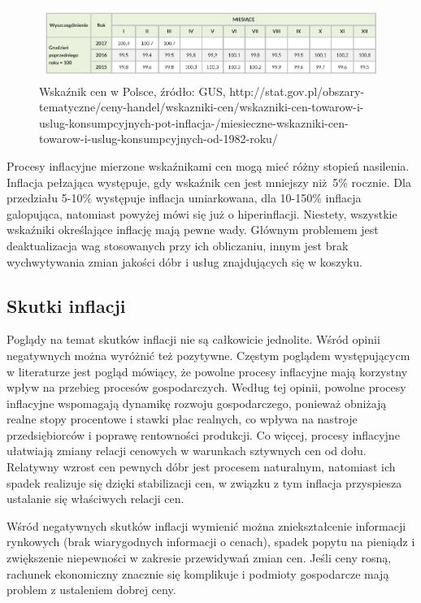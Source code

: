 \documentclass[12pt]{extarticle}
\begin{document}
\begin{figure}[H]
\centering
\includegraphics[width=15cm]{wskaznik_cen_polska}
    \caption{Wskaźnik cen w Polsce, źródło: GUS, http://stat.gov.pl/obszary-tematyczne/ceny-handel/wskazniki-cen/wskazniki-cen-towarow-i-uslug-konsumpcyjnych-pot-inflacja-/miesieczne-wskazniki-cen-towarow-i-uslug-konsumpcyjnych-od-1982-roku/}
\end{figure}

Procesy inflacyjne mierzone wskaźnikami cen mogą mieć różny stopień nasilenia. Inflacja pełzająca występuje, gdy wskaźnik cen jest mniejszy niż 5\% rocznie. Dla przedziału 5-10\% występuje inflacja umiarkowana, dla 10-150\% inflacja galopująca, natomiast powyżej mówi się już o hiperinflacji. Niestety, wszystkie wskaźniki określające inflację mają pewne wady. Głównym problemem jest deaktualizacja wag stosowanych przy ich obliczaniu, innym jest brak wychwytywania zmian jakości dóbr i usług znajdujących się w koszyku.

\subsection{Skutki inflacji}

Poglądy na temat skutków inflacji nie są całkowicie jednolite. Wśród opinii negatywnych można wyróżnić też pozytywne. Częstym poglądem występującycm w literaturze jest pogląd mówiący, że powolne procesy inflacyjne mają korzystny wpływ na przebieg procesów gospodarczych. Według tej opinii, powolne procesy inflacyjne wspomagają dynamikę rozwoju gospodarczego, ponieważ obniżają realne stopy procentowe i stawki płac realnych, co wpływa na nastroje przedsiębiorców i poprawę rentowności produkcji. Co więcej, procesy inflacyjne ułatwiają zmiany relacji cenowych w warunkach sztywnych cen od dołu. Relatywny wzrost cen pewnych dóbr jest procesem naturalnym, natomiast ich spadek realizuje się dzięki stabilizacji cen, w związku z tym inflacja przyspiesza ustalanie się właściwych relacji cen.

Wśród negatywnych skutków inflacji wymienić można zniekształcenie informacji rynkowych (brak wiarygodnych informacji o cenach), spadek popytu na pieniądz i zwiększenie niepewności w zakresie przewidywań zmian cen. Jeśli ceny rosną, rachunek ekonomiczny znacznie się komplikuje i podmioty gospodarcze mają problem z ustaleniem dobrej ceny.
\end{document}
